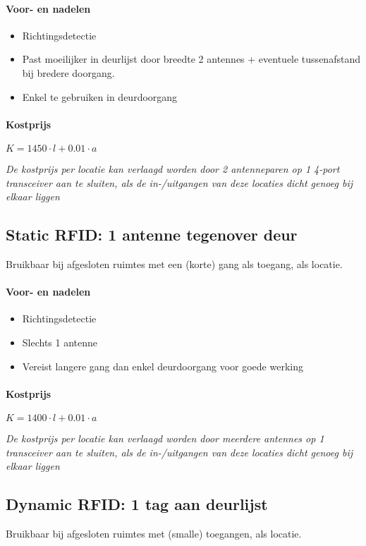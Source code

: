 \paragraph{Voor- en nadelen}
\begin{itemize}
	\color{ForestGreen}
	\item Richtingsdetectie
	\color{RedOrange}
	\item Past moeilijker in deurlijst door breedte 2 antennes + eventuele tussenafstand bij bredere doorgang.
	\item Enkel te gebruiken in deurdoorgang
\end{itemize}
\paragraph{Kostprijs}
\(K = 1450 \cdot l + 0.01 \cdot a\)

\emph{De kostprijs per locatie kan verlaagd worden door 2 antenneparen op 1 4-port transceiver aan te sluiten, als de in-/uitgangen van deze locaties dicht genoeg bij elkaar liggen}

\subsection{Static RFID: 1 antenne tegenover deur}
Bruikbaar bij afgesloten ruimtes met een (korte) gang als toegang, als locatie.
\paragraph{Voor- en nadelen}
\begin{itemize}
	\color{ForestGreen}
	\item Richtingsdetectie
	\item Slechts 1 antenne
	\color{RedOrange}
	\item Vereist langere gang dan enkel deurdoorgang voor goede werking
\end{itemize}
\paragraph{Kostprijs}
\(K = 1400 \cdot l + 0.01 \cdot a\)

\emph{De kostprijs per locatie kan verlaagd worden door meerdere antennes op 1 transceiver aan te sluiten, als de in-/uitgangen van deze locaties dicht genoeg bij elkaar liggen}

\subsection{Dynamic RFID: 1 tag aan deurlijst}
Bruikbaar bij afgesloten ruimtes met (smalle) toegangen, als locatie.

